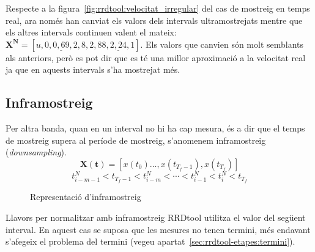 Respecte a la figura~\ref{fig:rrdtool:velocitat_irregular} del cas de mostreig en temps real, ara només han canviat els valors dels intervals ultramostrejats mentre que els altres intervals continuen valent el mateix: $\mathbf{X^N}=[u , 0 , \underline{0{,}69} , 2{,}8 , 2{,}88 , \underline{2{,}24} , 1]$. Els valors que canvien són molt semblants als anteriors, però es pot dir que es té una millor aproximació a la velocitat real ja que en aquests intervals s'ha mostrejat més.

\subsection{Inframostreig}

Per altra banda, quan en un interval no hi ha cap mesura, és a dir que el temps de mostreig supera al període de mostreig, s'anomenem inframostreig (\emph{downsampling}).
$$
\mathbf{X(t)}= [x(t_0)\ldots,x(t_{T_f-1}),x(t_{T_f})]
$$
$$
t^N_{i-m-1} < t_{T_f-1} < t^N_{i-m} < \cdots < t^N_{i-1} < t^N_i < t_{T_f}
$$ 

\begin{figure}[tbp]
  \centering
  \caption{Representació d'inframostreig}
  \label{fig:rrdtool-etapes:inframostreig}
\end{figure}


Llavors per normalitzar amb inframostreig RRDtool utilitza el valor del següent interval. En aquest cas se suposa que les mesures no tenen termini, més endavant s'afegeix el problema del termini (vegeu apartat~\ref{sec:rrdtool-etapes:termini}).


